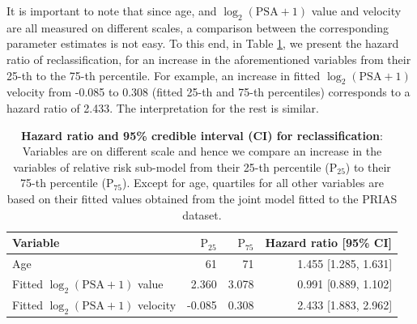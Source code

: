 It is important to note that since age, and ${\log_2 (\mbox{PSA} + 1)}$ value and velocity are all measured on different scales, a comparison between the corresponding parameter estimates is not easy. To this end, in Table \ref{tab:PSA_survival_easy}, we present the hazard ratio of reclassification, for an increase in the aforementioned variables from their 25-th to the 75-th percentile. For example, an increase in fitted $\log_2 (\mbox{PSA} + 1)$ velocity from -0.085 to 0.308 (fitted 25-th and 75-th percentiles) corresponds to a hazard ratio of 2.433. The interpretation for the rest is similar.

\begin{table}
\small\sf\centering
\caption{\textbf{Hazard ratio and 95\% credible interval (CI) for reclassification}: Variables are on different scale and hence we compare an increase in the variables of relative risk sub-model from their 25-th percentile ($\mbox{P}_{25}$) to their 75-th percentile ($\mbox{P}_{75}$). Except for age, quartiles for all other variables are based on their fitted values obtained from the joint model fitted to the PRIAS dataset.}
\label{tab:PSA_survival_easy}
\begin{tabular}{lrrr}
\hline
Variable                      & $\mbox{P}_{25}$   & $\mbox{P}_{75}$ & Hazard ratio [95\% CI] \\
\hline
Age & 61 & 71 & 1.455 [1.285, 1.631] \\
Fitted $\log_2 (\mbox{PSA} + 1)$ value & 2.360 & 3.078 & 0.991 [0.889, 1.102] \\
Fitted $\log_2 (\mbox{PSA} + 1)$ velocity & -0.085 & 0.308 & 2.433 [1.883, 2.962] \\
\hline
\end{tabular}
\end{table}


